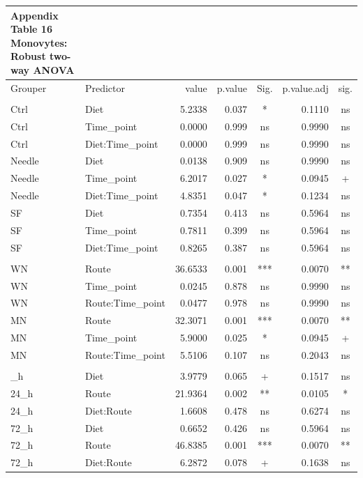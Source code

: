 \documentclass[
  12pt,
  letterpaper,
]{article}
\begin{document}
\begin{longtable}{l|lrrcrc}
\caption*{
{\large \textbf{Appendix Table 16}} \\ 
{\small \textbf{Monovytes: Robust two-way ANOVA}}
} \\ 
\toprule
\multicolumn{1}{l}{Grouper} & Predictor & value & p.value & Sig. & p.value.adj & sig. \\ 
\midrule\addlinespace[2.5pt]
\multicolumn{7}{l}{Grouped by Route} \\ 
\midrule\addlinespace[2.5pt]
Ctrl & Diet & 5.2338 & 0.037 & * & 0.1110 & ns \\ 
Ctrl & Time\_point & 0.0000 & 0.999 & ns & 0.9990 & ns \\ 
Ctrl & Diet:Time\_point & 0.0000 & 0.999 & ns & 0.9990 & ns \\ 
Needle & Diet & 0.0138 & 0.909 & ns & 0.9990 & ns \\ 
Needle & Time\_point & 6.2017 & 0.027 & * & 0.0945 & + \\ 
Needle & Diet:Time\_point & 4.8351 & 0.047 & * & 0.1234 & ns \\ 
SF & Diet & 0.7354 & 0.413 & ns & 0.5964 & ns \\ 
SF & Time\_point & 0.7811 & 0.399 & ns & 0.5964 & ns \\ 
SF & Diet:Time\_point & 0.8265 & 0.387 & ns & 0.5964 & ns \\ 
\midrule\addlinespace[2.5pt]
\multicolumn{7}{l}{Grouped by Diet} \\ 
\midrule\addlinespace[2.5pt]
WN & Route & 36.6533 & 0.001 & *** & 0.0070 & ** \\ 
WN & Time\_point & 0.0245 & 0.878 & ns & 0.9990 & ns \\ 
WN & Route:Time\_point & 0.0477 & 0.978 & ns & 0.9990 & ns \\ 
MN & Route & 32.3071 & 0.001 & *** & 0.0070 & ** \\ 
MN & Time\_point & 5.9000 & 0.025 & * & 0.0945 & + \\ 
MN & Route:Time\_point & 5.5106 & 0.107 & ns & 0.2043 & ns \\ 
\midrule\addlinespace[2.5pt]
\multicolumn{7}{l}{Grouped by Time\_point} \\ 
\midrule\addlinespace[2.5pt]
24\_h & Diet & 3.9779 & 0.065 & + & 0.1517 & ns \\ 
24\_h & Route & 21.9364 & 0.002 & ** & 0.0105 & * \\ 
24\_h & Diet:Route & 1.6608 & 0.478 & ns & 0.6274 & ns \\ 
72\_h & Diet & 0.6652 & 0.426 & ns & 0.5964 & ns \\ 
72\_h & Route & 46.8385 & 0.001 & *** & 0.0070 & ** \\ 
72\_h & Diet:Route & 6.2872 & 0.078 & + & 0.1638 & ns \\ 
\bottomrule
\end{longtable}
\end{document}
